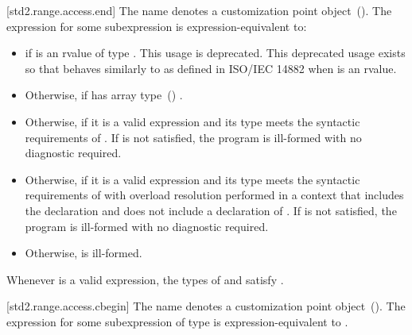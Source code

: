 [std2.range.access.end]{}
\pnum
The name  denotes a customization point
object~(). The expression
 for some subexpression  is expression-equivalent to:

\begin{itemize}
\item
   if  is an rvalue of
  type . This usage is deprecated.
  \enternote This deprecated usage exists so that
   behaves similarly to 
  as defined in ISO/IEC 14882 when  is an rvalue. \exitnote

\item
  Otherwise,  if  has array
  type~() .

\item
  Otherwise,  if it is a valid expression and its type  meets the
  syntactic requirements of
  . If
   is not satisfied, the program is ill-formed with
  no diagnostic required.

\item
  Otherwise,  if it is a valid expression and its type  meets the
  syntactic requirements of
   with overload
  resolution performed in a context that includes the declaration
   and does not include
  a declaration of . If  is not
  satisfied, the program is ill-formed with no diagnostic required.

\item
  Otherwise,  is ill-formed.
\end{itemize}

\pnum
\enternote Whenever  is a valid expression, the
types of  and  satisfy
. \exitnote

[std2.range.access.cbegin]{}
\pnum
The name  denotes a customization point
object~(). The expression
 for some subexpression  of type 
is expression-equivalent to .

